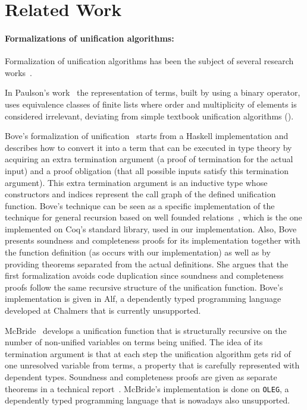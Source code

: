 \section{Related Work}\label{related}

\paragraph{Formalizations of unification algorithms:}
Formalization of unification algorithms has been the subject of
several research works~.

In Paulson's work~ the representation of terms, built
by using a binary operator, uses equivalence classes of finite lists
where order and multiplicity of elements is considered irrelevant,
deviating from simple textbook unification algorithms
().

Bove's formalization of unification~ starts from a
Haskell implementation and describes how to convert it into a term
that can be executed in type theory by acquiring an extra termination
argument (a proof of termination for the actual input) and a proof
obligation (that all possible inputs satisfy this termination
argument).  This extra termination argument is an inductive type whose
constructors and indices represent the call graph of the defined
unification function. Bove's technique can be seen as a specific
implementation of the technique for general recursion based on well
founded relations~, which is the one implemented on
Coq's standard library, used in our implementation.  Also, Bove
presents soundness and completeness proofs for its implementation
together with the function definition (as occurs with our
implementation) as well as by providing theorems separated from the
actual definitions. She argues that the first formalization avoids
code duplication since soundness and completeness proofs follow the
same recursive structure of the unification function. Bove's
implementation is given in Alf, a dependently typed programming
language developed at Chalmers that is currently unsupported.

McBride~ develops a unification function that is
structurally recursive on the number of non-unified variables on terms
being unified. The idea of its termination argument is that at each
step the unification algorithm gets rid of one unresolved variable
from terms, a property that is carefully represented with dependent
types. Soundness and completeness proofs are given as separate
theorems in a technical report~. McBride's
implementation is done on \texttt{OLEG}, a dependently typed
programming language that is nowadays also unsupported.

